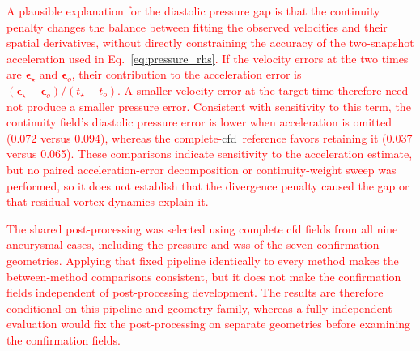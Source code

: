 \documentclass[12pt,a4paper]{article}
\newcommand{\CFD}{\ac{cfd}\xspace}
\newcommand{\WSS}{\ac{wss}\xspace}
\theoremstyle{definition}
\numberwithin{equation}{section}
\newcommand{\revision}[1]{\textcolor{red}{#1}}
\begin{document}
 \revision{A plausible explanation for the diastolic pressure gap is that the continuity penalty changes the balance between fitting the observed velocities and their spatial derivatives, without directly constraining the accuracy of the two-snapshot acceleration used in Eq.~\eqref{eq:pressure_rhs}. If the velocity errors at the two times are $\boldsymbol\epsilon_\star$ and $\boldsymbol\epsilon_o$, their contribution to the acceleration error is $(\boldsymbol\epsilon_\star-\boldsymbol\epsilon_o)/(t_\star-t_o)$. A smaller velocity error at the target time therefore need not produce a smaller pressure error. Consistent with sensitivity to this term, the continuity field's diastolic pressure error is lower when acceleration is omitted (0.072 versus 0.094), whereas the complete-}\CFD{}\ \revision{reference favors retaining it (0.037 versus 0.065). These comparisons indicate sensitivity to the acceleration estimate, but no paired acceleration-error decomposition or continuity-weight sweep was performed, so it does not establish that the divergence penalty caused the gap or that residual-vortex dynamics explain it.
}

\revision{The shared post-processing was selected using complete \CFD fields from all nine aneurysmal cases, including the pressure and \WSS of the seven confirmation geometries. Applying that fixed pipeline identically to every method makes the between-method comparisons consistent, but it does not make the confirmation fields independent of post-processing development. The results are therefore conditional on this pipeline and geometry family, whereas a fully independent evaluation would fix the post-processing on separate geometries before examining the confirmation fields.}
\end{document}
